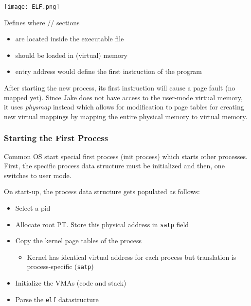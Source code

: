\newpar{}
\begin{center}
    \texttt{[image: ELF.png]}
\end{center}
Defines where // sections
\begin{itemize}
    \item are located inside the executable file
    \item should be loaded in (virtual) memory
    \item {} entry address would define the first instruction of the program
\end{itemize}

\newpar{}

After starting the new process, its first instruction will cause a page fault (no mapped yet). Since Jake does not have access to the user-mode virtual memory, it uses \textit{physmap} instead which allows for modification to page tables for creating new virtual mappings by mapping the entire physical memory to virtual memory.

\subsubsection{Starting the First Process}
Common OS start special first process (init process) which starts other processes. First, the specific process data structure must be initialized and then, one switches to user mode.

On start-up, the process data structure gets populated as follows:
\begin{itemize}
    \item Select a pid
    \item Allocate root PT. Store this physical address in \texttt{satp} field
    \item Copy the kernel page tables of the process
    \begin{itemize}
        \item Kernel has identical virtual address for each process but translation is process-specific (\texttt{satp})
    \end{itemize}
    \item Initialize the VMAs (code and stack)
    \item Parse the \texttt{elf} datastructure
\end{itemize}


